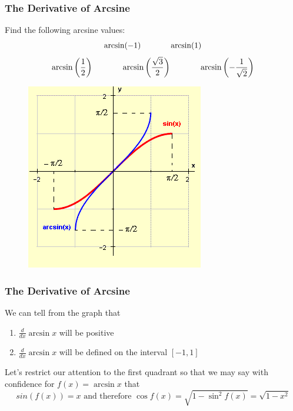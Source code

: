 \documentclass[xcolor=dvipsnames]{beamer}
\begin{document}
\begin{frame}
  \frametitle{The Derivative of Arcsine}
  {\ubung} Find the following arcsine values:
  \begin{equation}
    \label{eq:ahquoila}
    \arcsin(-1)\hspace{.5in}\arcsin(1)\notag
  \end{equation}
  \begin{equation}
    \label{eq:eengaine}
    \arcsin\left(\frac{1}{2}\right)\hspace{.5in}\arcsin\left(\frac{\sqrt{3}}{2}\right)\hspace{.5in}\arcsin\left(-\frac{1}{\sqrt{2}}\right)\notag
  \end{equation}
\begin{figure}[h]
\includegraphics[scale=.5]{./diagrams/arcsin.png}
\end{figure}
\end{frame}

\begin{frame}
  \frametitle{The Derivative of Arcsine}
  We can tell from the graph that
  \begin{enumerate}
  \item $\frac{d}{dx}\arcsin{}x$ will be positive
  \item $\frac{d}{dx}\arcsin{}x$ will be defined on the interval $[-1,1]$
  \end{enumerate}

  \bigskip

  Let's restrict our attention to the first quadrant so that we may say
with confidence for $f(x)=\arcsin{}x$ that
\begin{equation}
  \label{eq:sieheuvu}
  sin(f(x))=x\mbox{ and therefore }\cos{}f(x)=\sqrt{1-\sin^{2}f(x)}=\sqrt{1-x^{2}}
\end{equation}
\end{frame}
\end{document}
